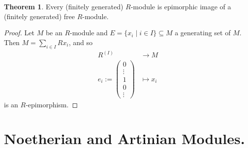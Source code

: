 \documentclass[12pt,a4paper]{report}
\theoremstyle{definition}
\newtheorem{theorem}{Theorem}[chapter] %
\theoremstyle{num.custom-title}
\DeclareMathOperator{\sse}{\subseteq}
\begin{document}
\begin{theorem}\label{fg-mod_is_epi-image}
Every (finitely generated) $R$-module is epimorphic image of a (finitely generated) free $R$-module.
\begin{proof}
Let $M$ be an $R$-module and $E = \{x_i \mid i \in I\} \sse M$ a generating set of $M$. Then $M=\sum_{i \in I} R x_i$, and so
\begin{align*}
R^{(I)} &\to M \\
e_i := 
\begin{pmatrix}
0 \\
\vdots \\
1 \\
0 \\
\vdots
\end{pmatrix}
&\mapsto x_i
\end{align*}
is an $R$-epimorphism.
\end{proof}
\end{theorem}

\section{Noetherian and Artinian Modules.}
\end{document}
